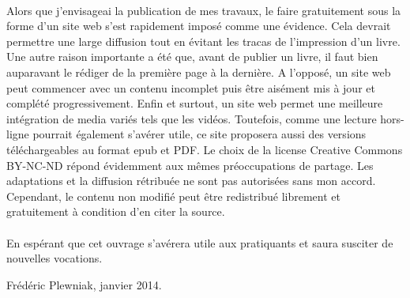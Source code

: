 \paragraph*{}
Alors que j'envisageai la publication de mes travaux, le faire gratuitement sous la forme d'un site web s'est rapidement imposé comme une évidence.
Cela devrait permettre une large diffusion tout en évitant les tracas de l'impression d'un livre.
Une autre raison importante a été que, avant de publier un livre, il faut bien auparavant le rédiger de la première page à la dernière.
A l'opposé, un site web peut commencer avec un contenu incomplet puis être aisément mis à jour et complété progressivement.
Enfin et surtout, un site web permet une meilleure intégration de media variés tels que les vidéos.
Toutefois, comme une lecture hors-ligne pourrait également s'avérer utile, ce site proposera aussi des versions téléchargeables au format epub et PDF.
Le choix de la license Creative Commons BY-NC-ND répond évidemment aux mêmes
préoccupations de partage.
Les adaptations et la diffusion rétribuée ne sont pas autorisées sans mon accord.
Cependant, le contenu non modifié peut être redistribué librement et gratuitement à condition d'en citer la source.

\paragraph*{}
En espérant que cet ouvrage s'avérera utile aux pratiquants et saura
susciter de nouvelles vocations.

\begin{flushright}
Frédéric Plewniak, janvier 2014.
\end{flushright}
